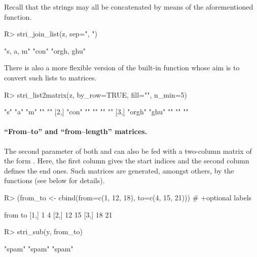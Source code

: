 \documentclass[nojss]{jss}
\begin{document}
\ifnotJSSversion
Recall that the strings may all be concatenated by means of the
aforementioned  function.

\begin{Schunk}
\begin{Sinput}
R> stri_join_list(z, sep=", ")
\end{Sinput}
\begin{Soutput}
[1] "s, a, m"   "con"       "orgh, ghu"
\end{Soutput}
\end{Schunk}



There is also a more flexible version
of the built-in  function whose
aim is to convert such lists to matrices.

\begin{Schunk}
\begin{Sinput}
R> stri_list2matrix(z, by_row=TRUE, fill="", n_min=5)
\end{Sinput}
\begin{Soutput}
     [,1]   [,2]  [,3] [,4] [,5]
[1,] "s"    "a"   "m"  ""   ""
[2,] "con"  ""    ""   ""   ""
[3,] "orgh" "ghu" ""   ""   ""
\end{Soutput}
\end{Schunk}
\fi


%






\paragraph{``From--to'' and ``from--length'' matrices.}
The second parameter of both  and 
can also be fed with a two-column matrix
of the form . Here, the first column
gives the start indices and the second column defines the end ones.
Such matrices are generated, amongst others, by the 
functions (see below for details).

\ifnotJSSversion
\begin{Schunk}
\begin{Sinput}
R> (from_to <- cbind(from=c(1, 12, 18), to=c(4, 15, 21))) # +optional labels
\end{Sinput}
\begin{Soutput}
     from to
[1,]    1  4
[2,]   12 15
[3,]   18 21
\end{Soutput}
\begin{Sinput}
R> stri_sub(y, from_to)
\end{Sinput}
\begin{Soutput}
[1] "spam" "spam" "spam"
\end{Soutput}
\end{Schunk}
\end{document}
